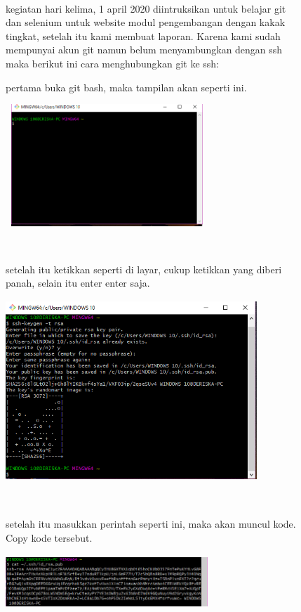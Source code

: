 \documentclass{book}
\begin{document}
\begin{enumerate}
\begin{figure} [ht]
\paragraph{} \quad kegiatan hari kelima, 1 april 2020 diintruksikan untuk belajar git dan selenium untuk website modul pengembangan dengan kakak tingkat, setelah itu kami membuat laporan. Karena kami sudah mempunyai akun git namun belum menyambungkan dengan ssh maka berikut ini cara menghubungkan git ke ssh:\\
    \item pertama buka git bash, maka tampilan akan seperti ini.\\
    \centerline{\includegraphics [width=7.65cm, height=4.59cm]{figures/3.1.png}}\\
    \end{figure} \begin{figure}
    \item setelah itu ketikkan seperti di layar, cukup ketikkan yang diberi panah, selain itu enter enter saja.\\
    \centerline{\includegraphics [width=9.47cm, height=6.8cm]{figures/3.2.png}}\\
    \item setelah itu masukkan perintah seperti ini, maka akan muncul kode. Copy kode tersebut.\\
    \centerline{\includegraphics [width=7.61cm, height=2.06cm]{figures/3.3.png}}\\

\end{figure}
\end{enumerate}
\end{document}
